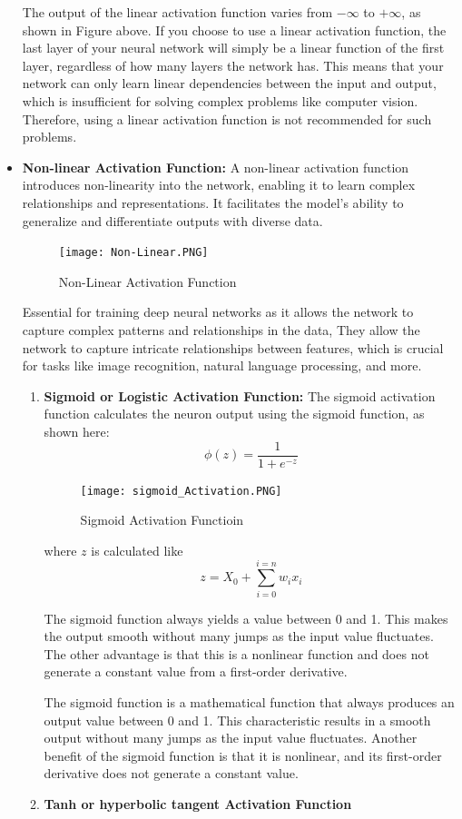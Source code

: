\begin{itemize}
    The output of the linear activation function varies from $-\infty$ to  $+\infty$, as shown in Figure above.
     If you choose to use a linear activation function, the last layer of your neural network will simply be a linear function of the first layer, regardless of how many layers the network has. This means that your network can only learn linear dependencies between the input and output, which is insufficient for solving complex problems like computer vision. Therefore, using a linear activation function is not recommended for such problems. \cite{bfortuner_mlglossary}\\
     \item \textbf{Non-linear Activation Function: } A non-linear activation function introduces non-linearity into the network, enabling it to learn complex relationships and representations. It facilitates the model's ability to generalize and differentiate outputs with diverse data.
    \begin{figure}[H]
        \centering\texttt{[image: Non-Linear.PNG]}
        \caption{Non-Linear Activation Function}
    \end{figure}
    Essential for training deep neural networks as it allows the network to capture complex patterns and relationships in the data, They allow the network to capture intricate relationships between features, which is crucial for tasks like image recognition, natural language processing, and more.
    \begin{enumerate}
        \item \textbf{Sigmoid or Logistic Activation Function: } 
    The sigmoid activation function calculates the neuron output using the sigmoid function, as shown here:
    $$\phi(z)=\frac{1}{1+e^{-z}}$$
    \begin{figure}[H]
        \centering\texttt{[image: sigmoid\_Activation.PNG]}
        \caption{Sigmoid Activation Functioin}
    \end{figure}
    where \(z\) is calculated like \\
    
    $$z=X_0+\sum_{i=0}^{i=n}w_{i}x_{i}$$
    
    The sigmoid function always yields a value between 0 and 1. This makes the output smooth without many jumps as the input value fluctuates. The other advantage is that this is a nonlinear function and does not generate a constant value from a first-order derivative.
    
    The sigmoid function is a mathematical function that always produces an output value between 0 and 1. This characteristic results in a smooth output without many jumps as the input value fluctuates. Another benefit of the sigmoid function is that it is nonlinear, and its first-order derivative does not generate a constant value.
    \item \textbf{Tanh or hyperbolic tangent Activation Function}
    

\end{enumerate}
\end{itemize}

